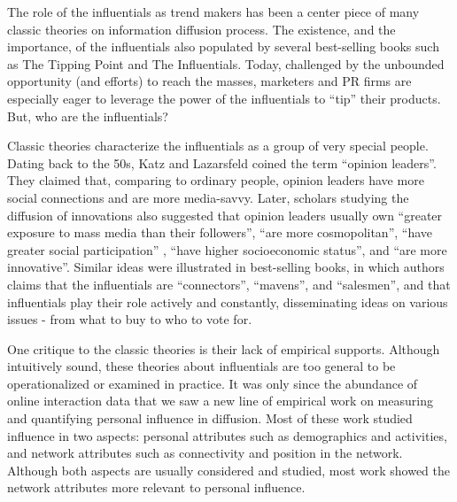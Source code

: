 \documentclass[phd,tocprelim]{cornell}
\begin{document}

The role of the influentials as trend makers has been a center piece of many classic theories on information diffusion process\cite{katz_lazarsfeld,rogers-2003}. The existence, and the importance, of the influentials also populated by several best-selling books such as The Tipping Point\cite{Gladwell:2002} and The Influentials\cite{keller_berry}. Today, challenged by the unbounded opportunity (and efforts) to reach the masses, marketers and PR firms are especially eager to leverage the power of the influentials to ``tip'' their products. But, who are the influentials? 

Classic theories characterize the influentials as a group of very special people. Dating back to the 50s, Katz and Lazarsfeld coined the term ``opinion leaders''. They claimed that, comparing to ordinary people, opinion leaders have more social connections and are more media-savvy\cite{katz_lazarsfeld}. Later, scholars studying the diffusion of innovations also suggested that opinion leaders usually own ``greater exposure to mass media than their followers'', ``are more cosmopolitan'', ``have greater social participation'' , ``have higher socioeconomic status'', and ``are more innovative''\cite{rogers-2003}. Similar ideas were illustrated in best-selling books, in which authors claims that the influentials are ``connectors'', ``mavens'', and ``salesmen''\cite{Gladwell:2002}, and that influentials play their role actively and constantly, disseminating ideas on various issues - from what to buy to who to vote for\cite{keller_berry}.

One critique to the classic theories is their lack of empirical supports. Although intuitively sound, these theories about influentials are too general to be operationalized or examined in practice. It was only since the abundance of online interaction data that we saw a new line of empirical work on measuring and quantifying personal influence in diffusion. Most of these work studied influence in two aspects: personal attributes such as demographics and activities, and network attributes such as connectivity and position in the network.  Although both aspects are usually considered and studied, most work showed the network attributes more relevant to personal influence\cite{Sun-2009,Bakshy-2011,Kempe-2003,kwak_10,Leskovec-EC-2006,Cha-2009}. 
\end{document}

